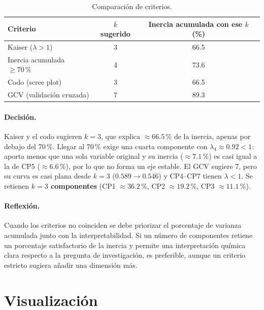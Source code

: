 \documentclass[11pt,a4paper]{article}
\begin{document}
\begin{table}[H]
\centering\small
\caption{Comparación de criterios.}
\begin{tabular}{lcc}
\toprule
Criterio & $k$ sugerido & Inercia acumulada con ese $k$ (\%) \\
\midrule
Kaiser ($\lambda > 1$) & 3 & 66.5 \\
Inercia acumulada $\geq 70\,\%$ & 4 & 73.6 \\
Codo (scree plot) & 3 & 66.5 \\
GCV (validación cruzada) & 7 & 89.3 \\
\bottomrule
\end{tabular}
\end{table}

\paragraph{Decisión.} Kaiser y el codo sugieren \textbf{$k = 3$}, que explica $\approx 66.5\,\%$ de la inercia, apenas por debajo del 70\,\%. Llegar al 70\,\% exige una cuarta componente con $\lambda_4 \approx 0.92 < 1$: aporta menos que una sola variable original y su inercia ($\approx 7.1\,\%$) es casi igual a la de CP5 ($\approx 6.6\,\%$), por lo que no forma un eje estable. El GCV sugiere 7, pero su curva es casi plana desde $k=3$ ($0.589 \to 0.546$) y CP4--CP7 tienen $\lambda < 1$. Se retienen \textbf{$k = 3$ componentes} (CP1 $\approx 36.2\,\%$, CP2 $\approx 19.2\,\%$, CP3 $\approx 11.1\,\%$).

\paragraph{Reflexión.} Cuando los criterios no coinciden se debe priorizar el porcentaje de varianza acumulada junto con la interpretabilidad. Si un número de componentes retiene un porcentaje satisfactorio de la inercia y permite una interpretación química clara respecto a la pregunta de investigación, es preferible, aunque un criterio estricto sugiera añadir una dimensión más.

\section{Visualización}
\end{document}
